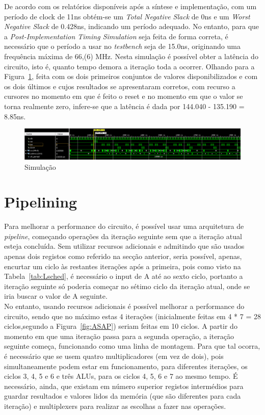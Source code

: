\documentclass{article} %
\begin{document}
		\noindent De acordo com os relatórios disponíveis após a síntese e implementação, com um período de clock de 11ns obtém-se um \emph{Total Negative Slack} de 0ns e um \emph{Worst Negative Slack} de 0.428ns, indicando um período adequado. No entanto, para que a \emph{Post-Implementation Timing Simulation} seja feita de forma correta, é necessário que o período a usar no \emph{testbench} seja de 15.0ns, originando uma frequência máxima de 66,(6) MHz. Nesta simulação é possível obter a latência do circuito, isto é, quanto tempo demora a iteração toda a ocorrer. Olhando para a Figura~\ref{fig:Sim}, feita com os dois primeiros conjuntos de valores disponibilizados e com os dois últimos e cujos resultados se apresentaram corretos, com recurso a cursores no momento em que é feito o reset e no momento em que o valor se torna realmente zero, infere-se que a latência é dada por 144.040 - 135.190 = 8.85ns.\\ 

		\begin{figure}[ht]
			\begin{center}
				\includegraphics[width=6.5in]{sim.png}
				\caption{Simulação}
				\label{fig:Sim}
			\end{center}
		\end{figure}


	\section{Pipelining}

		Para melhorar a performance do circuito, é possível usar uma arquitetura de \emph{pipeline}, começando operações da iteração seguinte sem que a iteração atual esteja concluída. Sem utilizar recursos adicionais e admitindo que são usados apenas dois registos como referido na secção anterior, seria possível, apenas, encurtar um ciclo às restantes iterações após a primeira, pois como visto na Tabela~\ref{tab:Lsched}, é necessário o input de A até ao sexto ciclo, portanto a iteração seguinte só poderia começar no sétimo ciclo da iteração atual, onde se iria buscar o valor de A seguinte.\\

		\noindent No entanto, usando recursos adicionais é possível melhorar a performance do circuito, sendo que no máximo estas 4 iterações (inicialmente feitas em 4 * 7 = 28 ciclos,segundo a Figura~\ref{fig:ASAP}) seriam feitas em 10 ciclos. A partir do momento em que uma iteração passa para a segunda operação, a iteração seguinte começa, funcionando como uma linha de montagem. Para que tal ocorra, é necessário que se usem quatro multiplicadores (em vez de dois), pois simultaneamente podem estar em funcionamento, para diferentes iterações, os ciclos 3, 4, 5 e 6 e três ALUs, para os ciclos 4, 5, 6 e 7 ao mesmo tempo. É necessário, ainda, que existam em número superior registos intermédios para guardar resultados e valores lidos da memória (que são diferentes para cada iteração) e multiplexers para realizar as escolhas a fazer nas operações.
\end{document}

